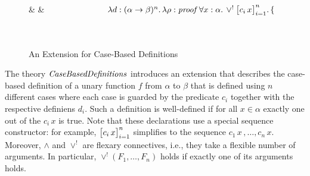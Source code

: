 \begin{figure}[ht]
\vspace{-1.5em}
\begin{center}
\begin{twelfsig}
\tsig{\CaseBased}\\
\tmeta{\Forms}{}\\
\\
\\
\decl{\impl}{\form\to\form\to\form}\\
\decl{\forall}{(\alpha\to\form)\to\form}\\
\\
& &$\hspace{2.65cm}\lflam[(\alpha\to\beta)^n]{d}\lflam[\ded\,\forall x:\alpha.\, \vee^{!} \lfseqbind{c_i\,x}{i}{n}]{\rho}\{$ \\
\\
\\
\tsigend
\end{twelfsig}
\end{center}
\vspace{-2em}
\caption{An Extension for Case-Based Definitions}\label{fig:casebased}
\vspace{-1.5em}
\end{figure}

The theory $\mathit{CaseBasedDefinitions}$ introduces an extension that describes the case-based definition of a unary function $f$ from $\alpha$ to $\beta$ that is defined using $n$ different cases where each case is guarded by the predicate $c_i$ together with the respective definiens $d_i$.
Such a definition is well-defined if for all $x \in\alpha$ exactly one out of the $c_i\,x$ is true.
Note that these declarations use a special sequence constructor: for example, $\big[c_i\,x\big]_{i = 1}^{n}$ simplifies to the sequence $c_1\,x\,,\ldots,c_n\,x$.
Moreover, $\wedge$ and $\vee^!$ are flexary connectives, i.e., they take a flexible number of arguments.
In particular, $\vee^!(F_1,\ldots,F_n)$ holds if exactly one of its arguments holds.

